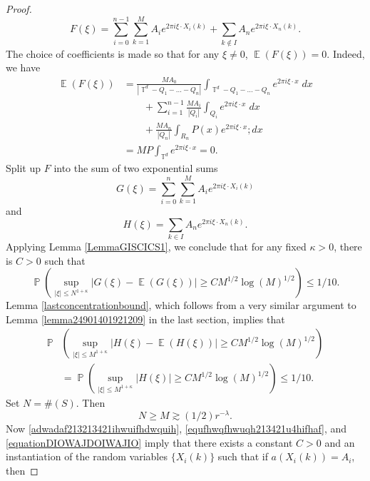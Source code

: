 \documentclass[dvipsnames,letterpaper,12pt]{article}
\numberwithin{equation}{section}
\DeclareMathOperator{\TT}{\mathbb{T}}
\numberwithin{theorem}{section}
\DeclareMathOperator{\EE}{\mathbb{E}}
\DeclareMathOperator{\PP}{\mathbb{P}}
\begin{document}
\begin{proof}
    \[ F(\xi) = \sum_{i = 0}^{n-1} \sum_{k = 1}^M A_i e^{2 \pi i \xi \cdot X_i(k)} + \sum_{k \not \in I} A_n e^{2 \pi i \xi \cdot X_n(k)}. \]
    The choice of coefficients is made so that for any $\xi \neq 0$, $\EE(F(\xi)) = 0$. Indeed, we have
    \begin{align*}
        \EE(F(\xi)) &= \frac{M A_0}{|\TT^d - Q_1 - \dots - Q_n|} \int_{\TT^d - Q_1 - \dots - Q_n} e^{2 \pi i \xi \cdot x}\; dx\\
        &\quad\quad + \sum_{i = 1}^{n-1} \frac{M A_i}{|Q_i|} \int_{Q_i} e^{2 \pi i \xi \cdot x}\; dx\\
        &\quad\quad + \frac{M A_n}{|Q_n|} \int_{R_n} P(x) e^{2 \pi i \xi \cdot x}; dx\\
        &= M P \int_{\TT^d} e^{2 \pi i \xi \cdot x} = 0.
    \end{align*}
    Split up $F$ into the sum of two exponential sums
    \[ G(\xi) = \sum_{i = 0}^n \sum_{k = 1}^M A_i e^{2 \pi i \xi \cdot X_i(k)} \]
    and
    \[ H(\xi) = \sum_{k \in I} A_n e^{2 \pi i \xi \cdot X_n(k)}. \]
    Applying Lemma \ref{LemmaGISCICS1}, we conclude that for any fixed $\kappa > 0$, there is $C > 0$ such that
    \begin{equation} \label{adwadaf213213421ihwuifhdwquih}
        \PP \left( \sup_{|\xi| \leq N^{1 + \kappa}} |G(\xi) - \EE(G(\xi))| \geq C M^{1/2} \log(M)^{1/2} \right) \leq 1/10.
    \end{equation}
    Lemma \ref{lastconcentrationbound}, which follows from a very similar argument to Lemma \ref{lemma24901401921209} in the last section, implies that
    \begin{equation} \label{equfhwqfhwuqh213421u4hifhaf}
    \begin{split}
        \PP & \left( \sup_{|\xi| \leq M^{1 + \kappa}} | H(\xi) - \EE(H(\xi)) | \geq C M^{1/2} \log(M)^{1/2} \right)\\
        &= \PP \left( \sup_{|\xi| \leq M^{1 + \kappa}} | H(\xi) | \geq C M^{1/2} \log(M)^{1/2} \right) \leq 1/10.
    \end{split}
    \end{equation}
    Set $N = \#(S)$. Then
    \begin{equation} \label{equationDIOWAJDOIWAJIO}
        N \geq M \gtrsim (1/2) r^{-\lambda}.
    \end{equation}
    Now \eqref{adwadaf213213421ihwuifhdwquih}, \eqref{equfhwqfhwuqh213421u4hifhaf}, and \eqref{equationDIOWAJDOIWAJIO} imply that there exists a constant $C > 0$ and an instantiation of the random variables $\{ X_i(k) \}$ such that if $a(X_i(k)) = A_i$, then

\end{proof}
\end{document}
